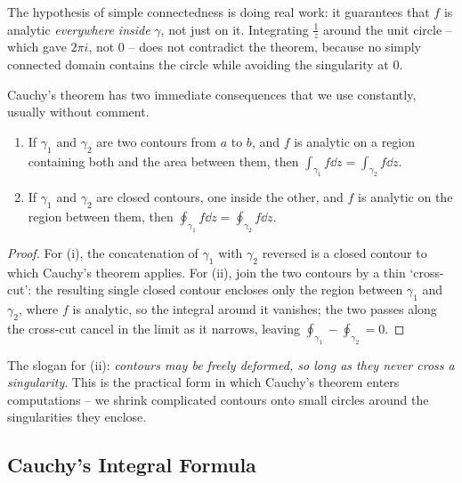 \documentclass[a4paper]{scrartcl}
\begin{document}
The hypothesis of simple connectedness is doing real work: it guarantees that $f$ is analytic \emph{everywhere inside} $\gamma$, not just on it. Integrating $\frac 1z$ around the unit circle -- which gave $2\pi i$, not $0$ -- does not contradict the theorem, because no simply connected domain contains the circle while avoiding the singularity at $0$.

Cauchy's theorem has two immediate consequences that we use constantly, usually without comment.

\begin{proposition}
	\begin{enumerate}[label=(\roman*)]
		\item If $\gamma_1$ and $\gamma_2$ are two contours from $a$ to $b$, and $f$ is analytic on a region containing both and the area between them, then $\int_{\gamma_1} f \dd z= \int_{\gamma_2} f \dd z$.
		\item If $\gamma_1$ and $\gamma_2$ are closed contours, one inside the other, and $f$ is analytic on the region between them, then $\oint_{\gamma_1} f \dd z = \oint_{\gamma_2} f \dd z$.
	\end{enumerate}
\end{proposition}
\begin{proof}
	For (i), the concatenation of $\gamma_1$ with $\gamma_2$ reversed is a closed contour to which Cauchy's theorem applies. For (ii), join the two contours by a thin `cross-cut': the resulting single closed contour encloses only the region between $\gamma_1$ and $\gamma_2$, where $f$ is analytic, so the integral around it vanishes; the two passes along the cross-cut cancel in the limit as it narrows, leaving $\oint_{\gamma_1} - \oint_{\gamma_2} = 0$.
\end{proof}

The slogan for (ii): \emph{contours may be freely deformed, so long as they never cross a singularity}. This is the practical form in which Cauchy's theorem enters computations -- we shrink complicated contours onto small circles around the singularities they enclose.

\subsection{Cauchy's Integral Formula}
\end{document}
